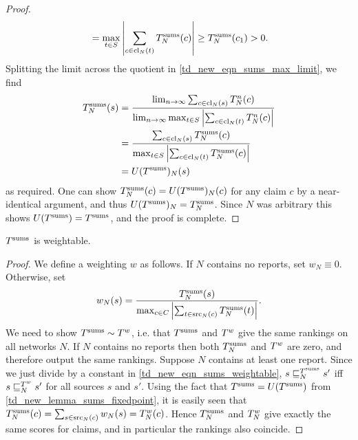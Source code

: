 \begin{proof}
\[{{            }
        }
        =
        \max_{t \in S}{\left|
            \sum_{c \in \operatorname{cl}_N(t)}{
                T^{\operatorname{sums}}_N(c)
            }
            \right|
        }
        \ge T^{\operatorname{sums}}_N(c_1)
        > 0.
    \]
    Splitting the limit across the quotient in
    \cref{td_new_eqn_sums_max_limit}, we find
    \begin{align*}
        T^{\operatorname{sums}}_N(s)
        &=
        \frac{
            \lim_{n \to \infty}{
                \sum_{c \in \operatorname{cl}_N(s)}{
                    T^n_N(c)
                }
            }
        }{
            \lim_{n \to \infty}{
                \max_{t \in S}{\left|
                    \sum_{c \in \operatorname{cl}_N(t)}{
                        T^n_N(c)
                    }
                    \right|
                }
            }
        } \\
        &=
        \frac{
            \sum_{c \in \operatorname{cl}_N(s)}{
                T^{\operatorname{sums}}_N(c)
            }
        }{
            \max_{t \in S}{\left|
                \sum_{c \in \operatorname{cl}_N(t)}{
                    T^{\operatorname{sums}}_N(c)
                }
                \right|
            }
        } \\
        &= U(T^{\operatorname{sums}})_N(s)
    \end{align*}
    as required. One can show $T^{\operatorname{sums}}_N(c) = U(T^{\operatorname{sums}})_N(c)$ for any claim $c$ by
    a near-identical argument, and thus $U(T^{\operatorname{sums}})_N = T^{\operatorname{sums}}_N$. Since $N$ was
    arbitrary this shows $U(T^{\operatorname{sums}}) = T^{\operatorname{sums}}$, and the proof is complete.
\end{proof}

\begin{corollary}
    \label{td_new_cor_sums_weightable}
    $T^{\operatorname{sums}}$ is weightable.
\end{corollary}

\begin{proof}
    We define a weighting $w$ as follows. If $N$ contains no reports, set $w_N
    \equiv 0$. Otherwise, set
    \begin{equation}
        w_N(s) =
        \frac{
            T^{\operatorname{sums}}_N(s)
        }
        {
            \max_{c \in C}{\left|
                \sum_{t \in \operatorname{src}_N(c)}{
                    T^{\operatorname{sums}}_N(t)
                }
            \right|}
        }.
        \label{td_new_eqn_sums_weightable}
    \end{equation}
    We need to show $T^{\operatorname{sums}} \sim T^{w}$, i.e. that $T^{\operatorname{sums}}$ and
    $T^{w}$ give the same rankings on all networks $N$. If $N$ contains
    no reports then both $T^{\operatorname{sums}}_N$ and $T^{w}$ are zero, and therefore
    output the same rankings. Suppose $N$ contains at least one report. Since
    we just divide by a constant in \cref{td_new_eqn_sums_weightable}, $s
    \sqsubseteq_N^{T^{\operatorname{sums}}} s'$ iff $s \sqsubseteq_N^{T^{w}} s'$ for all sources $s$ and
    $s'$. Using the fact that $T^{\operatorname{sums}} = U(T^{\operatorname{sums}})$ from
    \cref{td_new_lemma_sums_fixedpoint}, it is easily seen that $T^{\operatorname{sums}}_N(c) =
    \sum_{s \in \operatorname{src}_N(c)}{w_N(s)} = T^{w}_N(c)$. Hence $T^{\operatorname{sums}}_N$ and
    $T^{w}_N$ give exactly the same scores for claims, and in particular
    the rankings also coincide.
\end{proof}

